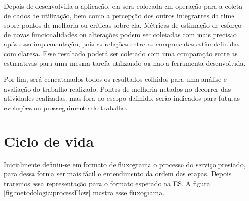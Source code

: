 Depois de desenvolvida a aplicação, ela será colocada em operação para a coleta 
de dados de utilização, bem como a percepção dos outros integrantes do time sobre 
pontos de melhoria ou críticas sobre ela. Métricas de estimação de esforço de novas 
funcionalidades ou alterações podem ser coletadas com mais precisão após essa 
implementação, pois as relações entre os componentes estão definidas com 
clareza. Esse resultado poderá ser coletado com uma comparação entre as 
estimativas para uma mesma tarefa utilizando ou não a ferramenta desenvolvida. 

Por fim, será concatenados todos os resultados colhidos para uma análise e 
avaliação do trabalho realizado. Pontos de melhoria notados no decorrer das 
atividades realizadas, mas fora do escopo definido, serão indicados para futuras 
evoluções ou prosseguimento do trabalho. 

	

	\section{{\color{blue}Ciclo de vida}}

	Inicialmente definiu-se em formato de fluxograma o processo do serviço prestado, para dessa forma ser 
	mais fácil o entendimento da ordem das etapas. Depois traremos essa representação para o formato esperado
	na ES. A figura \ref{fig:metodologia:processFlow} mostra esse fluxograma.
	
